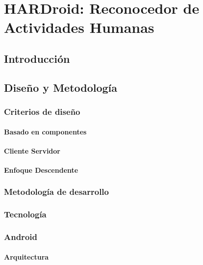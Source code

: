 
\chapter{HARDroid: Reconocedor de Actividades Humanas}

\label{chap5:hardroid}

\section{Introducción}

\section{Diseño y Metodología}

\subsection{Criterios de diseño}

\subsubsection{Basado en componentes}

\subsubsection{Cliente Servidor}

\subsubsection{Enfoque Descendente}

\subsection{Metodología de desarrollo}

\subsection{Tecnología}

\subsection{Android}

\subsubsection{Arquitectura}

